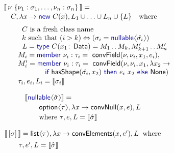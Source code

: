 \documentclass[10pt,preprint,blind,clearpagebib]{sigplanconf}
\newcommand{\langl}{\begin{picture}(4.5,7)
\put(1.1,2.5){\rotatebox{60}{\line(1,0){5.5}}}
\put(1.1,2.5){\rotatebox{300}{\line(1,0){5.5}}}
\end{picture}}
\newcommand{\rangl}{\begin{picture}(4.5,7)
\put(.9,2.5){\rotatebox{120}{\line(1,0){5.5}}}
\put(.9,2.5){\rotatebox{240}{\line(1,0){5.5}}}
\end{picture}}
\newcommand{\kvd}[1]{\textnormal{\textcolor{kvdclr}{\sffamily #1}}}
\newcommand{\ident}[1]{\textnormal{\sffamily #1}}
\newcommand{\sem}[1]{\llbracket #1 \rrbracket}
\begin{document}
\begin{figure}
\begin{multicols}{2}

\noindent
\begin{equation*}
\begin{array}{l}
 \sem{\,\nu~ \{ \nu_1 : \sigma_1, \ldots, \nu_n : \sigma_n \}\,} = \\[0.1em]
 \quad C, \lambda x\rightarrow \kvd{new}~C(x), L_1\cup\ldots\cup L_n\cup\{ L \}\quad\textnormal{where}\\[0.6em]
 \qquad \;\;C~\textnormal{is a fresh class name} \\
 \qquad \;\;k~\textnormal{such that}~(i > k) \Leftrightarrow (\sigma_i = \kvd{nullable}\langl \hat{\sigma_i} \rangl) \\
 \qquad \;\,\,L = \kvd{type}~C(x_1\!:\!\ident{Data})=M_1 \,.\,.\, M_k, M'_{k+1} \,.\,.\, M'_n  \\
 \qquad M_i = \kvd{member}~\nu_i:\tau_i=\ident{convField}(\nu, \nu_i, x_1, e_i),\\
 \qquad M'_i = \kvd{member}~\nu_i:\tau_i=\ident{convField}(\nu, \nu_i, x_1, \lambda x_2 \rightarrow \\
 \hspace{5.8em}  \kvd{if}~\ident{hasShape}(\hat{\sigma_i}, x_2)~\kvd{then}~ e_i~x_2~\kvd{else}~\ident{None}) \\[0.1em]
 \qquad \tau_i, e_i, L_i = \sem{\sigma_i} 
\end{array}
\end{equation*}
\vspace{-2em}

\begin{equation*}
\hspace{-1.25em}
\begin{array}{l}
 \sem{\kvd{nullable}\langl\hat{\sigma}\rangl} = \\[0.2em]
 \qquad \ident{option}\langl\tau\rangl, \lambda x \rightarrow \ident{convNull}(x,e), L\\[0.2em] 
 \qquad \textnormal{where}~\tau, e, L = \sem{\hat{\sigma}}
\end{array}
\end{equation*}
\vspace{-2em}

\begin{equation*}
\hspace{-1.25em}
\begin{array}{l}
 \sem{\,[\sigma]\,} = \ident{list}\langl\tau\rangl, \lambda x \rightarrow \ident{convElements}(x, e'), L \;\;\textnormal{where}\\[0.4em]
 \qquad \tau, e', L = \sem{\hat{\sigma}}
\end{array}
\end{equation*}


\end{multicols}
\end{figure}
\end{document}

